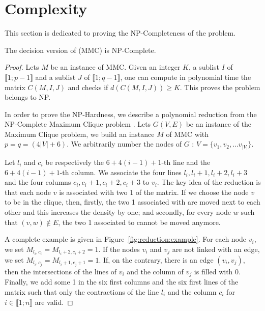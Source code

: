 \section{Complexity}
\label{sect:complexity}
 
This section is dedicated to proving the NP-Completeness of the problem.

  \begin{theorem}
  \label{theo:complexity}
  The decision version of (MMC) is NP-Complete.
  \end{theorem}
  \begin{proof}
 

    Lets $M$ be an instance of MMC. Given an integer $K$, a sublist $I$ of $\llbracket 1; p-1 \rrbracket$ and a sublist $J$ of $\llbracket 1; q-1 \rrbracket$, one can compute in polynomial time the matrix $C(M,I,J)$ and checks if $d(C(M,I,J)) \geq K$. This proves the problem belongs to NP.

    In order to prove the NP-Hardness, we describe a polynomial reduction from the NP-Complete Maximum Clique problem \cite{Karp1972}. Lets $G(V,E)$ be an instance of the Maximum Clique problem, we build an instance $M$ of MMC with $p = q = (4|V| + 6)$. We arbitrarily number the nodes of $G$ : $V = \{v_1, v_2, \dots v_{|V|}\}$.

    Let $l_i$ and $c_i$ be respectively the $6+4(i-1)+1$-th line and the $6+4(i-1)+1$-th column. We associate the four lines $l_i, l_i+1, l_i+2, l_i+3$ and the four columns $c_i, c_i +1, c_i+2, c_i + 3$ to $v_i$. The key idea of the reduction is that each node $v$ is associated with two 1 of the matrix. If we choose the node $v$ to be in the clique, then, firstly, the two 1 associated with are moved next to each other and this increases the density by one; and secondly, for every node $w$ such that $(v,w) \not\in E$, the two 1 associated to cannot be moved anymore.

A complete example is given in Figure~\ref{fig:reduction:example}. For each node $v_i$, we set $M_{l_i,c_i} = M_{l_i+2,c_i+2} = 1$. If the nodes $v_i$ and $v_j$ are not linked with an edge, we set $M_{l_i,c_j} = M_{l_i+1,c_j+1} = 1$. If, on the contrary, there is an edge $(v_i,v_j)$, then the intersections of the lines of $v_i$ and the column of $v_j$ is filled with 0. Finally, we add some 1 in the six first columns and the six first lines of the matrix such that only the contractions of the line $l_i$ and the column $c_i$ for $i \in \llbracket 1;n \rrbracket$ are valid.



\end{proof}
